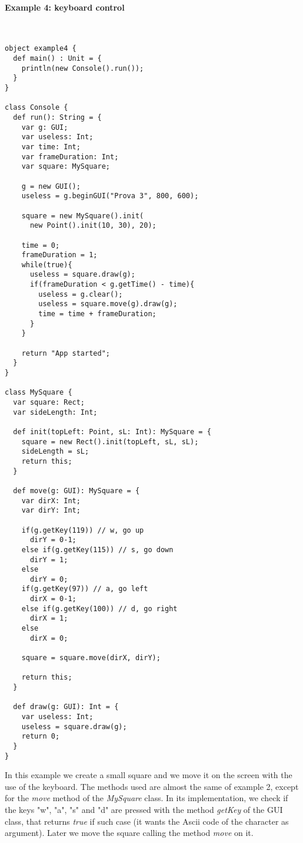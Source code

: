 \paragraph{Example 4: keyboard control}\mbox{}\\
\begin{lstlisting}
object example4 {
  def main() : Unit = {
    println(new Console().run());     
  }
}

class Console {
  def run(): String = {
    var g: GUI;
    var useless: Int;
    var time: Int;
    var frameDuration: Int;
    var square: MySquare;
		
    g = new GUI();
    useless = g.beginGUI("Prova 3", 800, 600);

    square = new MySquare().init(
      new Point().init(10, 30), 20);

    time = 0;
    frameDuration = 1;		
    while(true){
      useless = square.draw(g);
      if(frameDuration < g.getTime() - time){
        useless = g.clear();
        useless = square.move(g).draw(g);
        time = time + frameDuration;
      }
    }
		
    return "App started";
  }
}

class MySquare {
  var square: Rect;
  var sideLength: Int;

  def init(topLeft: Point, sL: Int): MySquare = {
    square = new Rect().init(topLeft, sL, sL);
    sideLength = sL;
    return this;
  }
	
  def move(g: GUI): MySquare = {
    var dirX: Int;
    var dirY: Int;
		
    if(g.getKey(119)) // w, go up
      dirY = 0-1;
    else if(g.getKey(115)) // s, go down
      dirY = 1;
    else 
      dirY = 0;
    if(g.getKey(97)) // a, go left
      dirX = 0-1;
    else if(g.getKey(100)) // d, go right
      dirX = 1;
    else
      dirX = 0;
			
    square = square.move(dirX, dirY);
		
    return this;
  }

  def draw(g: GUI): Int = {
    var useless: Int;
    useless = square.draw(g);
    return 0;
  }
}
\end{lstlisting}

In this example we create a small square and we move it on the screen with the use of the keyboard.
The methods used are almost the same of example 2, except for the \textit{move} method of the \textit{MySquare} class.
In its implementation, we check if the keys "w", "a", "s" and "d" are pressed with the method \textit{getKey} of the GUI class, that returns \textit{true} if such case (it wants the Ascii code of the character as argument).
Later we move the square calling the method \textit{move} on it.

